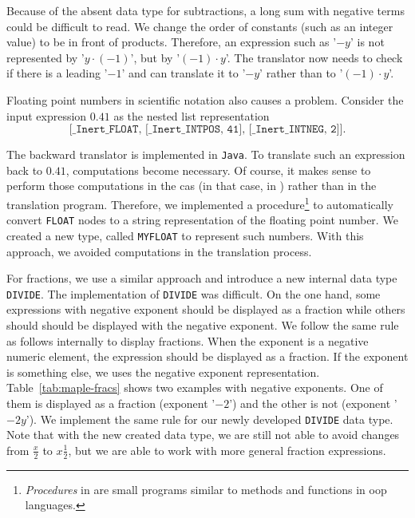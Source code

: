Because of the absent data type for subtractions, a long sum with negative terms could be difficult to read. We change the order of constants (such as an integer value) to be in front of products. Therefore, an expression such as '$-y$' is not represented by '$y\cdot (-1)$', but by '$(-1) \cdot y$'. The translator now needs to check if there is a leading '$-1$' and can translate it to '$-y$' rather than to '$(-1) \cdot y$'.

Floating point numbers in scientific notation also causes a problem. Consider the input expression $0.41$ as the nested list \inertF{} representation
\begin{equation}
\texttt{[\_Inert\_FLOAT, [\_Inert\_INTPOS, 41], [\_Inert\_INTNEG, 2]]}.
\end{equation}

The backward translator is implemented in \texttt{Java}. To translate such an expression back to $0.41$, computations become necessary. Of course, it makes sense to perform those computations in the \gls{cas} (in that case, in \Maple) rather than in the translation program. Therefore, we implemented a procedure\footnote{\textit{Procedures} in \Maple{} are small programs similar to methods and functions in \gls{oop} languages.} to automatically convert \texttt{FLOAT} nodes to a string representation of the floating point number. We created a new type, called \texttt{MYFLOAT} to represent such numbers. With this approach, we avoided computations in the translation process.

For fractions, we use a similar approach and introduce a new internal data type \texttt{DIVIDE}. The implementation of \texttt{DIVIDE} was difficult. On the one hand, some expressions with negative exponent should be displayed as a fraction while others should should be displayed with the negative exponent. We follow the same rule as \Maple{} follows internally to display fractions. When the exponent is a negative numeric element, the expression should be displayed as a fraction. If the exponent is something else, we uses the negative exponent representation. Table~\ref{tab:maple-fracs} shows two examples with negative exponents. One of them is displayed as a fraction (exponent '$-2$') and the other is not (exponent '$-2y$'). We implement the same rule for our newly developed \texttt{DIVIDE} data type. Note that with the new created data type, we are still not able to avoid changes from $\frac{x}{2}$ to $x\frac{1}{2}$, but we are able to work with more general fraction expressions.

